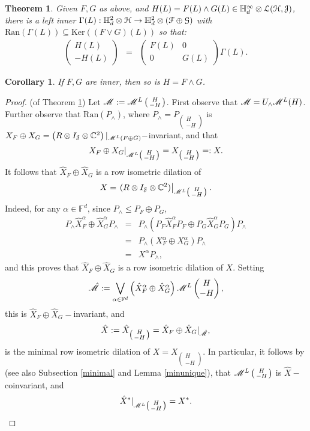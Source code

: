 \documentclass[11pt]{article}
\newcommand{\ba}{\begin{eqnarray}}
\newcommand{\ea}{\end{eqnarray}}
\newcommand{\bpm}{\begin{pmatrix}}
\newcommand{\epm}{\end{pmatrix}}
\newcommand{\bsm}{\left ( \begin{smallmatrix}}
\newcommand{\esm}{\end{smallmatrix} \right) }
\newcommand{\nn}{\nonumber}
\newcommand{\scr}{\ensuremath{\mathscr}}
\newcommand{\mc}{\ensuremath{\mathcal}}
\newcommand{\Ga}{\ensuremath{\Gamma}}
\def\C{\mathbb{C}}
\def\bH{\mathbb{H}}
\renewcommand{\H}{\ensuremath{\mathcal{H} }}
\newcommand{\J}{\ensuremath{\mathcal{J} }}
\newcommand{\F}{\ensuremath{\mathbb{F} }}
\newcommand{\ran}[1]{\ensuremath{\mathrm{Ran} \left( {#1} \right) }}
\renewcommand{\ker}[1]{\ensuremath{\mathrm{Ker} \left( {#1} \right) }}
\numberwithin{equation}{section}
\numberwithin{subsection}{section}
\newtheorem{thm}[subsection]{Theorem}
\newtheorem{cor}[subsection]{Corollary}
\theoremstyle{definition}
\begin{document}
\begin{thm} \label{Hid}
Given $F,G$ as above, and $H (L) = F(L) \wedge G(L) \in \bH ^\infty _d \otimes \mc{L} (\mc{H} , \mc{J} )$, there is a left inner $\Ga (L) : \bH ^2 _d \otimes \H \rightarrow \bH ^2 _d \otimes (\mc{F} \oplus \mc{G} )$ with $\ran{\Ga (L)} \subseteq \ker{(F \vee G) (L)}$ so that:
\ba \bpm H(L) \\ - H(L) \epm & = & \bpm F(L) & 0 \\ 0 & G(L) \epm \Ga (L). \ea
\end{thm}
\begin{cor}
If $F,G$ are inner, then so is $H = F \wedge G$.
\end{cor}
\begin{proof}{(of Theorem \ref{Hid})}
Let $\scr{M} := \scr{M} ^L \bsm H \\ - H \esm$.  First observe that $\scr{M} = U_\wedge \scr{M} ^L (H)$. Further observe that $\ran{P_\wedge }$, where $P_{\wedge} = P_{\bsm H \\ - H \esm}$ is $X_F \oplus X_G = \left( R \otimes I_\J \otimes \C ^2 \right) | _{\scr{M} ^L (F \oplus G)} -$invariant, and that 
$$ X _F \oplus X_G | _{\scr{M} ^L \bsm H \\ - H \esm} = X_{\bsm H \\ -H \esm}=: X. $$
It follows that $\hat{X} _F \oplus \hat{X} _G$ is a row isometric dilation of $$X  = \left. (R \otimes I_\J \otimes \C ^2 ) \right| _{\scr{M} ^L \bsm H \\ -H \esm }. $$ 
Indeed, for any $\alpha \in \F ^d$, since $P_\wedge \leq P_F \oplus P_G$,
\ba P_{\wedge} \hat{X} _F ^\alpha \oplus \hat{X} _G ^\alpha P_{\wedge} & = & P_\wedge (P_F \hat{X} _F ^\alpha P_F \oplus P_G \hat{X} _G ^\alpha P_G) P _\wedge \nn \\
& = & P_\wedge (X_F ^\alpha \oplus X_G ^\alpha) P_\wedge \nn \\
& = & X ^\alpha P_\wedge, \nn \ea and this proves that $\hat{X} _F \oplus \hat{X} _G$ is a row isometric dilation of $X$. Setting
$$ \hat{\scr{M}} := \bigvee _{\alpha \in \F ^d} \left( \hat{X} _F ^\alpha \oplus \hat{X} _G ^\alpha  \right) \scr{M} ^L \bpm H \\ - H \epm, $$ this is $\hat{X} _F \oplus \hat{X} _G -$invariant, and 
$$ \hat{X} := \hat{X} _{\bsm H \\ - H \esm } = \hat{X} _F \oplus \hat{X} _G | _{\hat{\scr{M}}}, $$ is the minimal row isometric dilation of $X = X_{\bsm H \\ - H \esm }$. In particular, it follows by \cite[Theorem 2.1]{Pop-dil} (see also Subsection \ref{minimal} and Lemma \ref{minunique}), that $\scr{M} ^L \bsm H \\ -H \esm$ is $\hat{X}-$coinvariant, and 
$$ \hat{X} ^* | _{\scr{M} ^L \bsm H \\ -H \esm} = X^*. $$ 


\end{proof}
\end{document}
